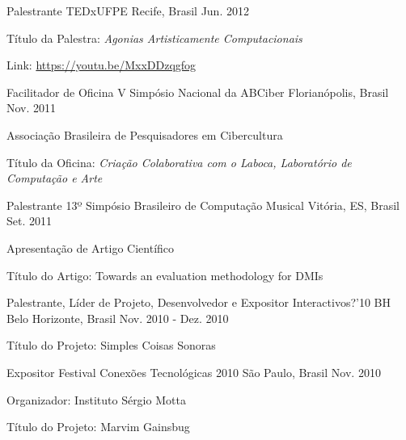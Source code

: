 \begin{cventries}
\cventry
	{Palestrante}
	{TEDxUFPE}
	{Recife, Brasil}
	{Jun. 2012}
	{\begin{cvitems}
		\item{Título da Palestra: \textit{Agonias Artisticamente Computacionais}}
		\item{Link: \href{https://youtu.be/MxxDDzqgfog}{https://youtu.be/MxxDDzqgfog}}
	\end{cvitems}}

\cventry
	{Facilitador de Oficina}
	{V Simpósio Nacional da ABCiber}
	{Florianópolis, Brasil}
	{Nov. 2011}
	{\begin{cvitems}
		\item{Associação Brasileira de Pesquisadores em Cibercultura}
		\item{Título da Oficina: \textit{Criação Colaborativa com o Laboca, Laboratório de Computação e Arte}}
	\end{cvitems}}

\cventry
	{Palestrante}
	{13º Simpósio Brasileiro de Computação Musical}
	{Vitória, ES, Brasil}
	{Set. 2011}
	{\begin{cvitems}
		\item{Apresentação de Artigo Científico}
		\item{Título do Artigo: Towards an evaluation methodology for DMIs}
	\end{cvitems}}

\cventry
	{Palestrante, Líder de Projeto, Desenvolvedor e Expositor}
	{Interactivos?'10 BH}
	{Belo Horizonte, Brasil}
	{Nov. 2010 - Dez. 2010}
	{\begin{cvitems}
		\item{Título do Projeto: Simples Coisas Sonoras}
	\end{cvitems}}

\cventry
	{Expositor}
	{Festival Conexões Tecnológicas 2010}
	{São Paulo, Brasil}
	{Nov. 2010}
	{\begin{cvitems}
		\item{Organizador: Instituto Sérgio Motta}
		\item{Título do Projeto: Marvim Gainsbug}
	\end{cvitems}}


\end{cventries}
